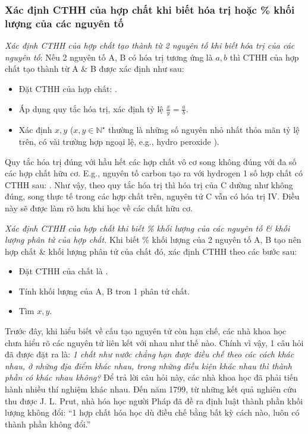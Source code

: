 \documentclass{article}
\begin{document}
\subsubsection{Xác định CTHH của hợp chất khi biết hóa trị hoặc \% khối lượng của các nguyên tố}
 \textit{Xác định CTHH của hợp chất tạo thành từ 2 nguyên tố khi biết hóa trị của các nguyên tố}: Nếu 2 nguyên tố A, B có hóa trị tương ứng là $a,b$ thì CTHH của hợp chất tạo thành từ A \& B được xác định như sau:
\begin{itemize}
	\item Đặt CTHH của hợp chất: .
	\item Áp dụng quy tắc hóa trị, xác định tỷ lệ $\frac{x}{y} = \frac{a}{b}$.
	\item Xác định $x,y$ ($x,y\in\mathbb{N}^\star$ thường là những số nguyên nhỏ nhất thỏa mãn tỷ lệ trên, có vài trường hợp ngoại lệ, e.g., hydro peroxide ).
\end{itemize}
Quy tắc hóa trị đúng với hầu hết các hợp chất vô cơ song không đúng với đa số các hợp chất hữu cơ. E.g., nguyên tố carbon tạo ra với hydrogen 1 số hợp chất có CTHH sau: . Như vậy, theo quy tắc hóa trị thì hóa trị của C dường như không đúng, song thực  tế trong các hợp chất trên, nguyên tử C vẫn có hóa trị IV. Điều này sẽ được làm rõ hơn khi học về các chất hữu cơ.

\noindent{} \textit{Xác định CTHH của hợp chất khi biết \% khối lượng của các nguyên tố \& khối lượng phân tử của hợp chất.} Khi biết \% khối lượng của 2 nguyên tố A, B tạo nên hợp chất \& khối lượng phân tử của chất đó, xác định CTHH theo các bước sau:
\begin{itemize}
	\item Đặt CTHH của chất là .
	\item Tính khối lượng của A, B tron 1 phân tử chất.
	\item Tìm $x,y$.
\end{itemize}
Trước đây, khi hiểu biết về cấu tạo nguyên tử còn hạn chế, các nhà khoa học chưa hiểu rõ các nguyên tử liên kết với nhau như thế nào. Chính vì vậy, 1 câu hỏi đã được đặt ra là: \textit{1 chất như nước chẳng hạn được điều chế theo các cách khác nhau, ở những địa điểm khác nhau, trong những điều kiện khác nhau thì thành phần có khác nhau không?} Để trả lời câu hỏi này, các nhà khoa học đã phải tiến hành nhiều thí nghiệm khác nhau. Đến năm 1799, từ những kết quả nghiên cứu thu được J. L. Prut, nhà hóa học người Pháp đã đề ra định luật thành phần khối lượng không đổi: ``1 hợp chất hóa học dù điều chế bằng bất kỳ cách nào, luôn có thành phần không đổi.''
\end{document}
